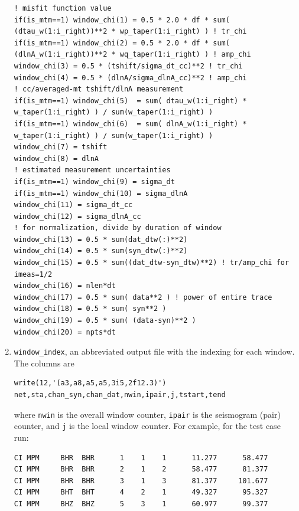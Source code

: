 \documentclass[11pt,titlepage,fleqn]{article}
\begin{document}
\begin{enumerate}
\begin{verbatim}
! misfit function value
if(is_mtm==1) window_chi(1) = 0.5 * 2.0 * df * sum( (dtau_w(1:i_right))**2 * wp_taper(1:i_right) ) ! tr_chi
if(is_mtm==1) window_chi(2) = 0.5 * 2.0 * df * sum( (dlnA_w(1:i_right))**2 * wq_taper(1:i_right) ) ! amp_chi
window_chi(3) = 0.5 * (tshift/sigma_dt_cc)**2 ! tr_chi
window_chi(4) = 0.5 * (dlnA/sigma_dlnA_cc)**2 ! amp_chi
! cc/averaged-mt tshift/dlnA measurement
if(is_mtm==1) window_chi(5)  = sum( dtau_w(1:i_right) * w_taper(1:i_right) ) / sum(w_taper(1:i_right) )
if(is_mtm==1) window_chi(6)  = sum( dlnA_w(1:i_right) * w_taper(1:i_right) ) / sum(w_taper(1:i_right) )
window_chi(7) = tshift
window_chi(8) = dlnA
! estimated measurement uncertainties
if(is_mtm==1) window_chi(9) = sigma_dt
if(is_mtm==1) window_chi(10) = sigma_dlnA
window_chi(11) = sigma_dt_cc
window_chi(12) = sigma_dlnA_cc
! for normalization, divide by duration of window
window_chi(13) = 0.5 * sum(dat_dtw(:)**2)
window_chi(14) = 0.5 * sum(syn_dtw(:)**2)
window_chi(15) = 0.5 * sum((dat_dtw-syn_dtw)**2) ! tr/amp_chi for imeas=1/2
window_chi(16) = nlen*dt
window_chi(17) = 0.5 * sum( data**2 ) ! power of entire trace
window_chi(18) = 0.5 * sum( syn**2 )
window_chi(19) = 0.5 * sum( (data-syn)**2 )
window_chi(20) = npts*dt
\end{verbatim}
\item \verb+window_index+, an abbreviated output file with the indexing for each window. The columns are
\begin{verbatim}
write(12,'(a3,a8,a5,a5,3i5,2f12.3)') net,sta,chan_syn,chan_dat,nwin,ipair,j,tstart,tend
\end{verbatim}
where \verb+nwin+ is the overall window counter, \verb+ipair+ is the seismogram (pair) counter, and \verb+j+ is the local window counter. For example, for the test case run:
%
\begin{verbatim}
CI MPM     BHR  BHR      1    1    1      11.277      58.477
CI MPM     BHR  BHR      2    1    2      58.477      81.377
CI MPM     BHR  BHR      3    1    3      81.377     101.677
CI MPM     BHT  BHT      4    2    1      49.327      95.327
CI MPM     BHZ  BHZ      5    3    1      60.977      99.377
\end{verbatim}
%
\end{enumerate}
\end{document}
